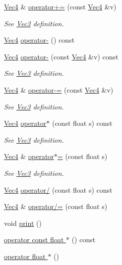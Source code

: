 \begin{DoxyCompactItemize}
\hyperlink{struct_ori_engine_1_1_vec4}{Vec4} \& \hyperlink{struct_ori_engine_1_1_vec4_a49a96e495f80b4c03df2353ac88654a2}{operator+=} (const \hyperlink{struct_ori_engine_1_1_vec4}{Vec4} \&v)
\begin{DoxyCompactList}\small\item\em See \hyperlink{struct_ori_engine_1_1_vec3}{Vec3} definition. \end{DoxyCompactList}\item 
\hyperlink{struct_ori_engine_1_1_vec4}{Vec4} \hyperlink{struct_ori_engine_1_1_vec4_aa84e93dcbac56ffa66068af8abd1aed5}{operator-\/} () const
\item 
\hyperlink{struct_ori_engine_1_1_vec4}{Vec4} \hyperlink{struct_ori_engine_1_1_vec4_ab9f5420252322ccd1a683a78eb7177cb}{operator-\/} (const \hyperlink{struct_ori_engine_1_1_vec4}{Vec4} \&v) const
\begin{DoxyCompactList}\small\item\em See \hyperlink{struct_ori_engine_1_1_vec3}{Vec3} definition. \end{DoxyCompactList}\item 
\hyperlink{struct_ori_engine_1_1_vec4}{Vec4} \& \hyperlink{struct_ori_engine_1_1_vec4_a213cbae8de217866744a5c83349c4033}{operator-\/=} (const \hyperlink{struct_ori_engine_1_1_vec4}{Vec4} \&v)
\begin{DoxyCompactList}\small\item\em See \hyperlink{struct_ori_engine_1_1_vec3}{Vec3} definition. \end{DoxyCompactList}\item 
\hyperlink{struct_ori_engine_1_1_vec4}{Vec4} \hyperlink{struct_ori_engine_1_1_vec4_adbd1dee1fe6d1ebc4b9f72a66b8de0b6}{operator$\ast$} (const float s) const
\begin{DoxyCompactList}\small\item\em See \hyperlink{struct_ori_engine_1_1_vec3}{Vec3} definition. \end{DoxyCompactList}\item 
\hyperlink{struct_ori_engine_1_1_vec4}{Vec4} \& \hyperlink{struct_ori_engine_1_1_vec4_a104e6844bc375f3a88d8497bc65a4ec3}{operator$\ast$=} (const float s)
\begin{DoxyCompactList}\small\item\em See \hyperlink{struct_ori_engine_1_1_vec3}{Vec3} definition. \end{DoxyCompactList}\item 
\hyperlink{struct_ori_engine_1_1_vec4}{Vec4} \hyperlink{struct_ori_engine_1_1_vec4_aa6e144f7ab67f6dfcaf09a02067c5b57}{operator/} (const float s) const
\item 
\hyperlink{struct_ori_engine_1_1_vec4}{Vec4} \& \hyperlink{struct_ori_engine_1_1_vec4_af0fc00ff1ac696f44b2cc2addd9be4bb}{operator/=} (const float s)
\item 
void \hyperlink{struct_ori_engine_1_1_vec4_a3ed05625c5422292da6218fc6294c85c}{print} ()
\item 
\hyperlink{struct_ori_engine_1_1_vec4_a51a4a0aa30a09d5de4a38925d230c847}{operator const float $\ast$} () const
\item 
\hyperlink{struct_ori_engine_1_1_vec4_a9f1df44372c5cfb62e42741684bff87d}{operator float $\ast$} ()
\end{DoxyCompactItemize}
